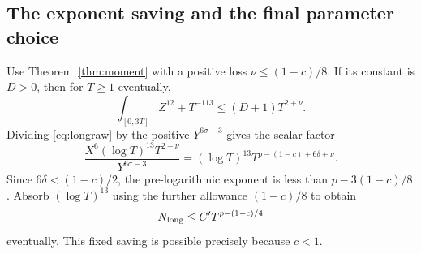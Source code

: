 \documentclass[11pt,a4paper]{article}
\numberwithin{equation}{section}
\theoremstyle{definition}
\newcommand{\zabs}{Z}
\begin{document}
\subsection{The exponent saving and the final parameter choice}
Use Theorem~\ref{thm:moment} with a positive loss
$\nu\le(1-c)/8$. If its constant is $D>0$, then for $T\ge1$ eventually,
\[
 \int_{[0,3T]}\zabs^{12}+T^{-113}\le(D+1)T^{2+\nu}.
\]
Dividing \eqref{eq:longraw} by the positive $Y^{6\sigma-3}$ gives the scalar
factor
\begin{equation*}
 \frac{X^6(\log T)^{13}T^{2+\nu}}{Y^{6\sigma-3}}
   =(\log T)^{13}T^{p-(1-c)+6\delta+\nu}.
\end{equation*}
Since $6\delta<(1-c)/2$, the pre-logarithmic exponent is less than
$p-3(1-c)/8$. Absorb $(\log T)^{13}$ using the further allowance
$(1-c)/8$ to obtain
\begin{equation}\label{eq:longcount}
 N_{\rm long}\le C' T^{p-(1-c)/4}
\end{equation}
eventually. This fixed saving is possible precisely because $c<1$.
\end{document}
